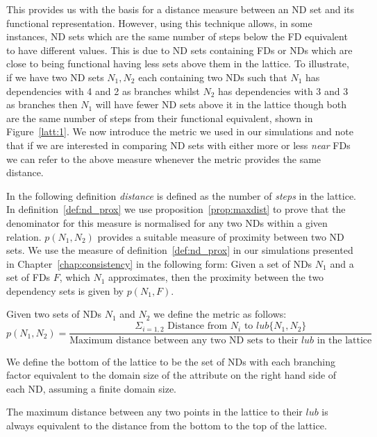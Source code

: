 \smallskip

This provides us with the basis for a distance measure between an ND set
and its functional representation. However,  using this technique allows,
in some instances, ND sets which are the same number of steps below the
FD equivalent to have different values. This is due to ND sets containing
FDs or NDs which are close to being functional having less sets above them
in the lattice. To illustrate, if we have two ND sets $N_1,N_2$ each containing two NDs such that $N_1$ has dependencies with 4 and 2 as branches whilst $N_2$ has dependencies with 3 and 3 as branches then $N_1$ will have fewer ND sets
above it in the lattice though both are the same number of steps from their
functional equivalent, shown in Figure~\ref{latt:1}. We now introduce the 
metric we used in our simulations
and note that if we are interested in comparing ND sets with either more 
or less {\em near} FDs we can refer to the above measure 
whenever the metric provides the same distance.
\smallskip

In the following definition {\em distance} is defined as the number of
{\em steps} in the lattice. In definition~\ref{def:nd_prox} we
use proposition~\ref{prop:maxdist} to prove that the denominator for
this measure is normalised for any two NDs within a given
relation. $p(N_1,N_2)$ provides a suitable measure of proximity
between two ND sets. We use the measure of
definition~\ref{def:nd_prox} in our simulations presented in
Chapter~\ref{chap:consistency} in the following form: Given a set of NDs $N_1$ and a set of FDs $F$, which $N_1$ approximates,
then the proximity between the two dependency sets is given by
$p(N_1,F)$. 
\begin{definition}\label{def:nd_prox}
\begin{rm}
Given two sets of NDs $N_1$ and $N_2$ we define the metric as follows: 
\[
p(N_1,N_2) = \frac{\Sigma_{i = 1, 2} \mbox{ Distance from } N_i \mbox{ to }  lub \{ N_1, N_2 \}}
{\mbox{Maximum distance between any two ND sets to their $lub$ in the lattice}}
\]
\end{rm}
\end{definition}

We define the bottom of the
lattice to be the set of NDs with each branching factor equivalent to
the domain size of the attribute on the right hand side of each
ND, assuming a finite domain size.

\smallskip
\begin{proposition}\label{prop:maxdist}
\begin{rm}
The maximum distance between any two points in
the lattice to their $lub$ is always equivalent to the
distance from the bottom to the top of the lattice. 
\end{rm}
\end{proposition}

